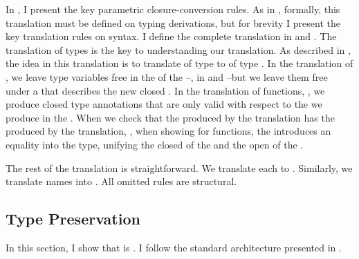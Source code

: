 \FigCoCCCTermShort
In , I present the key parametric
closure-conversion rules.
As in , formally, this translation must be defined on
typing derivations, but for brevity I present the key translation rules on syntax.
I define the complete translation in 
 and .
The translation of  types is the key to understanding
our translation.
As described in , the idea in this translation is
to translate  of type \im{\spity{\sx}{\sA}{\sB}} to
 of type
\im{\pccnexistty{\pccalpha:\pccstarty,\pccn:\pccalpha}{(\pcctrlufunty{\pccn}{\pcccodety{\pccx:\pccA}{\pccB}})}}.
In the translation of , we leave type variables free in the  of the
--\ie, in \im{\pccA} and \im{\pccB}--but we leave them free under
a 
\im{(\pcctrlufunty{\pccn}{\pcccodety{\pccx:\pccA}{\pccB}})} that describes the
new closed .
In the translation of functions, \im{\cctrans{\sfune{\sx}{\sA}{\se}}}, we produce
closed type annotations that are only valid with respect to the
 we produce in the .
When we check that the  produced by the translation has the
 produced by the translation, \ie, when showing  for functions, the  introduces an
equality  into the type, unifying the closed  of the
 and the open  of the .

The rest of the translation is straightforward.
We translate each \im{\sstarty} to \im{\pccstarty}.
Similarly, we translate names \im{\sx} into \im{\pccx}.
All omitted rules are structural.

\subsection{Type Preservation}
In this section, I show that  is .
I follow the standard architecture presented in .

